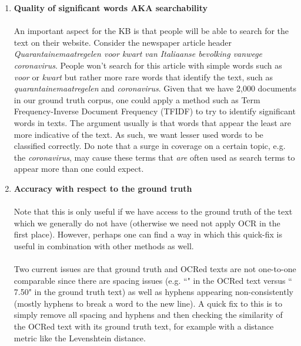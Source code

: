 \documentclass{article}
\begin{document}
\begin{enumerate}
		\item \textbf{Quality of significant words AKA searchability}
		\\ \\
		An important aspect for the KB is that people will be able to search for the text on their website. Consider the newspaper article header \textit{Quarantainemaatregelen voor kwart van Italiaanse bevolking vanwege coronavirus}. People won't search for this article with simple words such as \textit{voor} or \textit{kwart} but rather more rare words that identify the text, such as \textit{quarantainemaatregelen} and \textit{coronavirus}. Given that we have 2,000 documents in our ground truth corpus, one could apply a method such as Term Frequency-Inverse Document Frequency (TFIDF) to try to identify significant words in texts. The argument usually is that words that appear the least are more indicative of the text. As such, we want lesser used words to be classified correctly. Do note that a surge in coverage on a certain topic, e.g. the \textit{coronavirus}, may cause these terms that \textit{are} often used as search terms to appear more than one could expect.
		
		\newpage
		
		\item \textbf{Accuracy with respect to the ground truth}
		\\ \\
		Note that this is only useful if we have access to the ground truth of the text which we generally do not have (otherwise we need not apply OCR in the first place). However, perhaps one can find a way in which this quick-fix is useful in combination with other methods as well.
		\\ \\
		Two current issues are that ground truth and OCRed texts are not one-to-one comparable since there are spacing issues (e.g. ``" in the OCRed text versus ``\EUR{} 7.50" in the ground truth text) as well as hyphens appearing non-consistently (mostly hyphens to break a word to the new line). A quick fix to this is to simply remove all spacing and hyphens and then checking the similarity of the OCRed text with its ground truth text, for example with a distance metric like the Levenshtein distance.
	\end{enumerate}	
	
	
	
	
\end{document}
